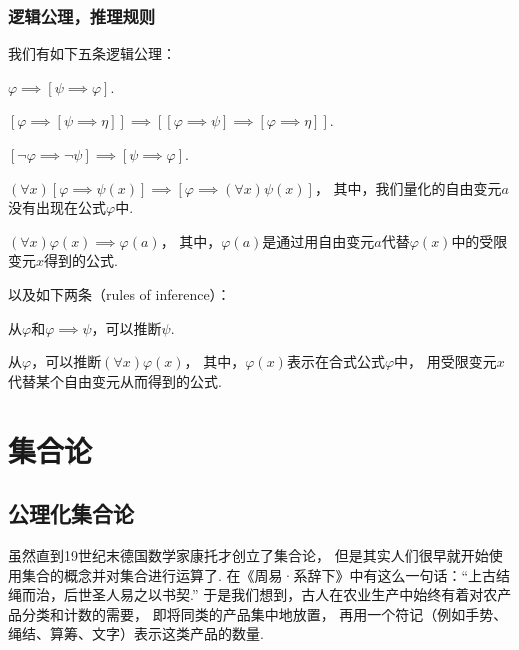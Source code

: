 \subsection{逻辑公理，推理规则}
我们有如下五条逻辑公理：
\begin{axiom}
\(\varphi \implies [\psi \implies \varphi]\).
\end{axiom}
\begin{axiom}
\([\varphi \implies [\psi \implies \eta]] \implies [[\varphi \implies \psi] \implies [\varphi \implies \eta]]\).
\end{axiom}
\begin{axiom}
\([\neg\varphi \implies \neg\psi] \implies [\psi \implies \varphi]\).
\end{axiom}
\begin{axiom}
\((\forall x)[\varphi \implies \psi(x)] \implies [\varphi \implies (\forall x) \psi(x)]\)，
其中，我们量化的自由变元\(a\)没有出现在公式\(\varphi\)中.
\end{axiom}
\begin{axiom}
\((\forall x) \varphi(x) \implies \varphi(a)\)，
其中，\(\varphi(a)\)是通过用自由变元\(a\)代替\(\varphi(x)\)中的受限变元\(x\)得到的公式.
\end{axiom}
以及如下两条（rules of inference）：
\begin{axiom}
从\(\varphi\)和\(\varphi \implies \psi\)，可以推断\(\psi\).
\end{axiom}
\begin{axiom}
从\(\varphi\)，可以推断\((\forall x) \varphi(x)\)，
其中，\(\varphi(x)\)表示在合式公式\(\varphi\)中，
用受限变元\(x\)代替某个自由变元从而得到的公式.
\end{axiom}


\chapter{集合论}

\section{公理化集合论}
虽然直到19世纪末德国数学家康托才创立了集合论，
但是其实人们很早就开始使用集合的概念并对集合进行运算了.
在《周易·系辞下》中有这么一句话：“上古结绳而治，后世圣人易之以书契.”
于是我们想到，古人在农业生产中始终有着对农产品分类和计数的需要，
即将同类的产品集中地放置，
再用一个符记（例如手势、绳结、算筹、文字）表示这类产品的数量.

